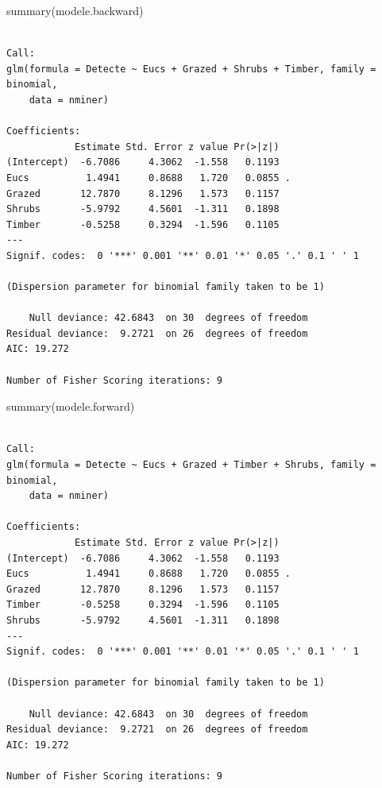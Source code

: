 \documentclass[
  french,
  letterpaper,
  DIV=11,
  numbers=noendperiod]{scrreprt}
\newenvironment{Shaded}{\begin{snugshade}}{\end{snugshade}}
\newcommand{\FunctionTok}[1]{\textcolor[rgb]{0.28,0.35,0.67}{#1}}
\newcommand{\NormalTok}[1]{\textcolor[rgb]{0.00,0.23,0.31}{#1}}
\begin{document}
\begin{Shaded}
\begin{Highlighting}[]
\FunctionTok{summary}\NormalTok{(modele.backward)}
\end{Highlighting}
\end{Shaded}

\begin{verbatim}

Call:
glm(formula = Detecte ~ Eucs + Grazed + Shrubs + Timber, family = binomial, 
    data = nminer)

Coefficients:
            Estimate Std. Error z value Pr(>|z|)  
(Intercept)  -6.7086     4.3062  -1.558   0.1193  
Eucs          1.4941     0.8688   1.720   0.0855 .
Grazed       12.7870     8.1296   1.573   0.1157  
Shrubs       -5.9792     4.5601  -1.311   0.1898  
Timber       -0.5258     0.3294  -1.596   0.1105  
---
Signif. codes:  0 '***' 0.001 '**' 0.01 '*' 0.05 '.' 0.1 ' ' 1

(Dispersion parameter for binomial family taken to be 1)

    Null deviance: 42.6843  on 30  degrees of freedom
Residual deviance:  9.2721  on 26  degrees of freedom
AIC: 19.272

Number of Fisher Scoring iterations: 9
\end{verbatim}

\begin{Shaded}
\begin{Highlighting}[]
\FunctionTok{summary}\NormalTok{(modele.forward)}
\end{Highlighting}
\end{Shaded}

\begin{verbatim}

Call:
glm(formula = Detecte ~ Eucs + Grazed + Timber + Shrubs, family = binomial, 
    data = nminer)

Coefficients:
            Estimate Std. Error z value Pr(>|z|)  
(Intercept)  -6.7086     4.3062  -1.558   0.1193  
Eucs          1.4941     0.8688   1.720   0.0855 .
Grazed       12.7870     8.1296   1.573   0.1157  
Timber       -0.5258     0.3294  -1.596   0.1105  
Shrubs       -5.9792     4.5601  -1.311   0.1898  
---
Signif. codes:  0 '***' 0.001 '**' 0.01 '*' 0.05 '.' 0.1 ' ' 1

(Dispersion parameter for binomial family taken to be 1)

    Null deviance: 42.6843  on 30  degrees of freedom
Residual deviance:  9.2721  on 26  degrees of freedom
AIC: 19.272

Number of Fisher Scoring iterations: 9
\end{verbatim}
\end{document}
